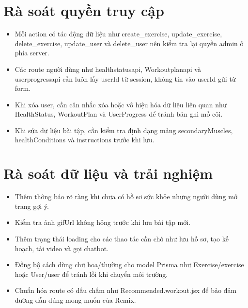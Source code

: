 \section{Rà soát quyền truy cập}

\begin{itemize}

    \item Mỗi action có tác động dữ liệu như create\_exercise, update\_exercise, delete\_exercise, update\_user và delete\_user nên kiểm tra lại quyền admin ở phía server.

    \item Các route người dùng như healthstatusapi, Workoutplanapi và userprogressapi cần luôn lấy userId từ session, không tin vào userId gửi từ form.

    \item Khi xóa user, cần cân nhắc xóa hoặc vô hiệu hóa dữ liệu liên quan như HealthStatus, WorkoutPlan và UserProgress để tránh bản ghi mồ côi.

    \item Khi sửa dữ liệu bài tập, cần kiểm tra định dạng mảng secondaryMuscles, healthConditions và instructions trước khi lưu.

\end{itemize}

\section{Rà soát dữ liệu và trải nghiệm}

\begin{itemize}

    \item Thêm thông báo rõ ràng khi chưa có hồ sơ sức khỏe nhưng người dùng mở trang gợi ý.

    \item Kiểm tra ảnh gifUrl không hỏng trước khi lưu bài tập mới.

    \item Thêm trạng thái loading cho các thao tác cần chờ như lưu hồ sơ, tạo kế hoạch, tải video và gọi chatbot.

    \item Đồng bộ cách dùng chữ hoa/thường cho model Prisma như Exercise/exercise hoặc User/user để tránh lỗi khi chuyển môi trường.

    \item Chuẩn hóa route có dấu chấm như Recommended.workout.jsx để bảo đảm đường dẫn đúng mong muốn của Remix.

\end{itemize}

